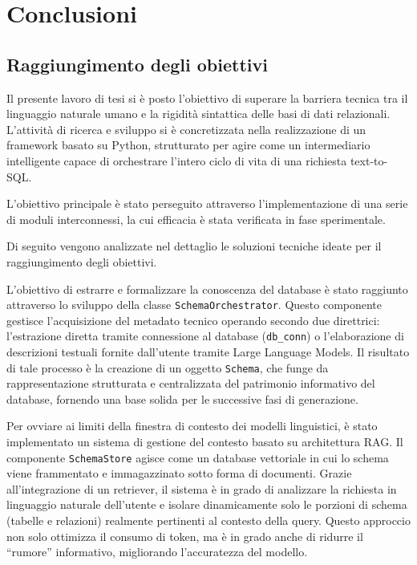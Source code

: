 \chapter{Conclusioni}\label{conclusioni}

\section{Raggiungimento degli
obiettivi}\label{raggiungimento-degli-obiettivi}

Il presente lavoro di tesi si è posto l'obiettivo di
superare la barriera tecnica tra il linguaggio naturale umano e la
rigidità sintattica delle basi di dati relazionali. L'attività di
ricerca e sviluppo si è concretizzata nella realizzazione di un
framework basato su Python, strutturato per agire come un intermediario
intelligente capace di orchestrare l'intero ciclo di vita di una
richiesta text-to-SQL.

L'obiettivo principale è stato perseguito attraverso l'implementazione
di una serie di moduli interconnessi, la cui efficacia è stata
verificata in fase sperimentale.

Di seguito vengono analizzate
nel dettaglio le soluzioni tecniche ideate per il raggiungimento
degli obiettivi.

L'obiettivo di estrarre e formalizzare la conoscenza del database è
stato raggiunto attraverso lo sviluppo della classe
\texttt{SchemaOrchestrator}. Questo componente gestisce l'acquisizione
del metadato tecnico operando secondo due direttrici: l'estrazione
diretta tramite connessione al database (\texttt{db\_conn}) o
l'elaborazione di descrizioni testuali fornite dall'utente tramite Large
Language Models. Il risultato di tale processo è la creazione di un
oggetto \texttt{Schema}, che funge da rappresentazione strutturata e
centralizzata del patrimonio informativo del database, fornendo una
base solida per le successive fasi di generazione.

Per ovviare ai limiti della finestra di contesto dei modelli linguistici, è
stato implementato un sistema di gestione del contesto basato su
architettura RAG. Il componente \texttt{SchemaStore} agisce come un
database vettoriale in cui lo schema viene frammentato e immagazzinato
sotto forma di documenti. Grazie all'integrazione di un
retriever, il sistema è in grado di analizzare la richiesta in
linguaggio naturale dell'utente e isolare dinamicamente solo le porzioni
di schema (tabelle e relazioni) realmente pertinenti al contesto della
query. Questo approccio non solo ottimizza il consumo di token, ma
è in grado anche di ridurre il ``rumore'' informativo, migliorando
l'accuratezza del modello.


